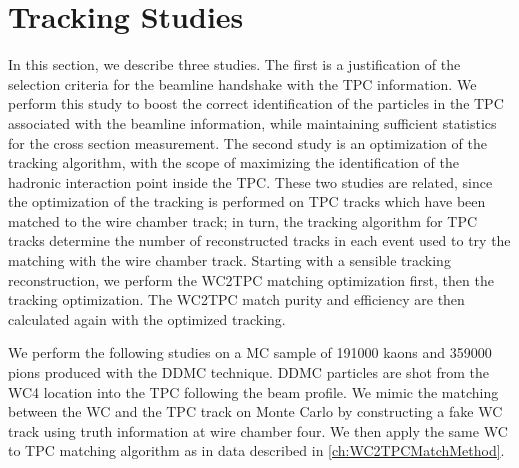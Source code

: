 \section{Tracking Studies}
In this section, we describe three studies. The first is a justification of the selection criteria for the beamline handshake with the TPC information.  We perform this study to boost  the correct identification of the particles in the TPC associated with the beamline information, while maintaining sufficient statistics for the cross section measurement. 
The second study is an optimization of the tracking algorithm, with the scope of maximizing the identification of the hadronic interaction point inside the TPC. These two studies are related, since the optimization of the tracking is performed on TPC tracks which have been matched to the wire chamber track; in turn, the tracking algorithm for TPC tracks determine the number of reconstructed tracks in each event used to try the matching with the wire chamber track. Starting with a sensible tracking reconstruction, we perform the WC2TPC matching optimization first, then the tracking optimization. The WC2TPC match purity and efficiency  are then calculated again with the optimized tracking.


We perform the following studies on a MC sample of 191000 kaons and 359000 pions produced with the DDMC technique. DDMC particles are shot from the WC4 location into the TPC following the beam profile.
We mimic the matching between the WC and the TPC track on Monte Carlo by constructing a fake WC track using truth information at wire chamber four. We then apply the same WC to TPC matching algorithm as in data described in \ref{ch:WC2TPCMatchMethod}. 




